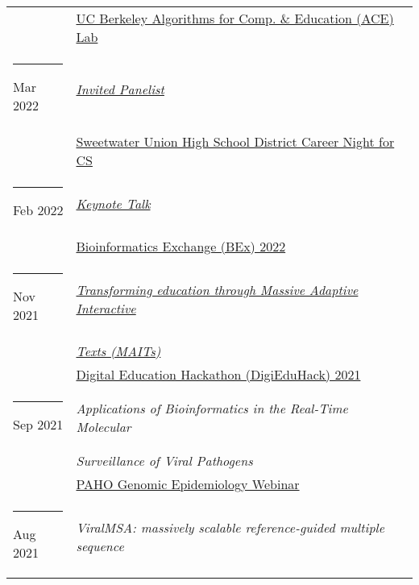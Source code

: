 \documentclass[margin,line]{res}
\begin{document}
\begin{resume}
\begin{longtable}{@{}p{0.7in}p{4in}}
\hspace*{-4mm} & \hspace{4mm} \href{https://acelab.berkeley.edu/}{UC Berkeley Algorithms for Comp. \& Education (ACE) Lab}\\
\hspace*{-4mm} \rule{-1mm}{5mm} Mar 2022 & \href{http://www.sweetwaterschools.org/}{\textit{Invited Panelist}}\\*
\hspace*{-4mm} & \hspace{4mm} \href{http://www.sweetwaterschools.org/}{Sweetwater Union High School District Career Night for CS}\\
\hspace*{-4mm} \rule{-1mm}{5mm} Feb 2022 & \href{https://bioinformatics.ucsd.edu/node/138}{\textit{Keynote Talk}}\\*
\hspace*{-4mm} & \hspace{4mm} \href{https://bioinformatics.ucsd.edu/node/138}{Bioinformatics Exchange (BEx) 2022}\\
\hspace*{-4mm} \rule{-1mm}{5mm} Nov 2021 & \href{https://www.youtube.com/watch?v=EPU_nv-yb_w&t=8206s}{\textit{Transforming education through Massive Adaptive Interactive}}\\*
\hspace*{-4mm} & \hspace{4mm} \href{https://www.youtube.com/watch?v=EPU_nv-yb_w&t=8206s}{\textit{Texts (MAITs)}}\\*
\hspace*{-4mm} & \hspace{4mm} \href{https://digieduhack.com/}{Digital Education Hackathon (DigiEduHack) 2021}\\
\hspace*{-4mm} \rule{-1mm}{5mm} Sep 2021 & \textit{Applications of Bioinformatics in the Real-Time Molecular}\\*
\hspace*{-4mm} & \hspace{4mm} \textit{Surveillance of Viral Pathogens}\\*
\hspace*{-4mm} & \hspace{4mm} \href{https://www.paho.org/}{PAHO Genomic Epidemiology Webinar}\\
\hspace*{-4mm} \rule{-1mm}{5mm} Aug 2021 & \textit{ViralMSA: massively scalable reference-guided multiple sequence}\\*

\end{longtable}
\end{resume}
\end{document}
